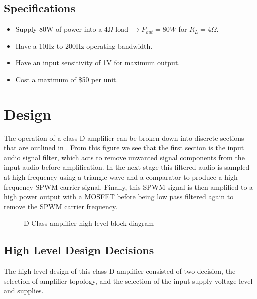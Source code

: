 \documentclass[a4paper,11pt]{article}
\begin{document}
\subsection{Specifications}\label{S:specs}

\begin{itemize}
    \item Supply 80W of power into a 4$\Omega$ load $\rightarrow P_{out} = 80W$ for $R_L = 4\Omega$.
    \item Have a 10Hz to 200Hz operating bandwidth.
    \item Have an input sensitivity of 1V for maximum output.
    \item Cost a maximum of \$50 per unit.
\end{itemize}

\section{Design}\label{S:design}

The operation of a class D amplifier can be broken down into discrete sections that are outlined in . From this figure we see that the first section is the input audio signal filter, which acts to remove unwanted signal components from the input audio before amplification. In the next stage this filtered audio is sampled at high frequency using a triangle wave and a comparator to produce a high frequency SPWM carrier signal. Finally, this SPWM signal is then amplified to a high power output with a MOSFET before being low pass filtered again to remove the SPWM carrier frequency.

\begin{figure}[h!]
    \centering
    \caption{D-Class amplifier high level block diagram}
    \label{F:block}
\end{figure}

\subsection{High Level Design Decisions}

The high level design of this class D amplifier consisted of two decision, the selection of amplifier topology, and the selection of the input supply voltage level and supplies.\\
\end{document}
